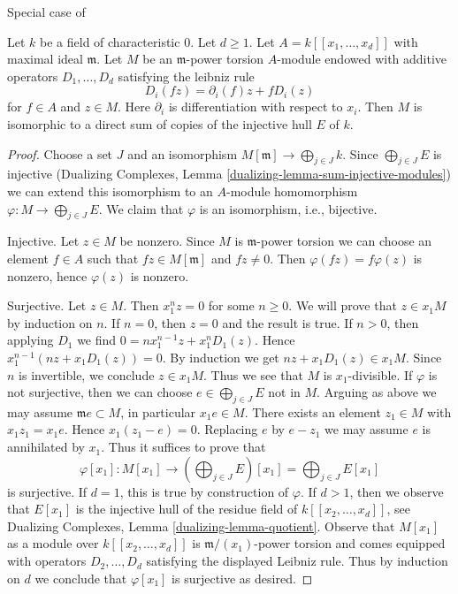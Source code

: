 \begin{lemma}
\label{lemma-structure-torsion-D-module-regular}
\begin{reference}
Special case of \cite[Theorem 2.4]{Lyubeznik}
\end{reference}
Let $k$ be a field of characteristic $0$. Let $d \geq 1$.
Let $A = k[[x_1, \ldots, x_d]]$ with maximal ideal $\mathfrak m$.
Let $M$ be an $\mathfrak m$-power torsion $A$-module endowed with
additive operators $D_1, \ldots, D_d$ satisfying the leibniz rule
$$
D_i(fz) = \partial_i(f) z + f D_i(z)
$$
for $f \in A$ and $z \in M$. Here $\partial_i$ is
differentiation with respect to $x_i$.
Then $M$ is isomorphic to a direct sum
of copies of the injective hull $E$ of $k$.
\end{lemma}

\begin{proof}
Choose a set $J$ and an isomorphism $M[\mathfrak m] \to \bigoplus_{j \in J} k$.
Since $\bigoplus_{j \in J} E$ is injective
(Dualizing Complexes, Lemma \ref{dualizing-lemma-sum-injective-modules})
we can extend this isomorphism to an $A$-module homomorphism
$\varphi : M \to \bigoplus_{j \in J} E$.
We claim that $\varphi$ is an isomorphism, i.e., bijective.

\medskip\noindent
Injective. Let $z \in M$ be nonzero. Since $M$ is $\mathfrak m$-power torsion
we can choose an element $f \in A$ such that $fz \in M[\mathfrak m]$ and
$fz \not = 0$. Then $\varphi(fz) = f\varphi(z)$ is nonzero, hence
$\varphi(z)$ is nonzero.

\medskip\noindent
Surjective. Let $z \in M$. Then $x_1^n z = 0$ for some $n \geq 0$.
We will prove that $z \in x_1M$ by induction on $n$.
If $n = 0$, then $z = 0$ and the result is true.
If $n > 0$, then applying $D_1$ we find $0 = n x_1^{n - 1} z + x_1^nD_1(z)$.
Hence $x_1^{n - 1}(nz + x_1D_1(z)) = 0$. By induction we get
$nz + x_1D_1(z) \in x_1M$. Since $n$ is invertible, we conclude
$z \in x_1M$. Thus we see that $M$ is $x_1$-divisible.
If $\varphi$ is not surjective, then we can choose
$e \in \bigoplus_{j \in J} E$ not in $M$.
Arguing as above we may assume $\mathfrak m e \subset M$,
in particular $x_1 e \in M$. There exists an element
$z_1 \in M$ with $x_1 z_1 = x_1 e$. Hence
$x_1(z_1 - e) = 0$. Replacing $e$ by $e - z_1$
we may assume $e$ is annihilated by $x_1$.
Thus it suffices to prove that
$$
\varphi[x_1] :
M[x_1]
\longrightarrow
\left(\bigoplus\nolimits_{j \in J} E\right)[x_1] =
\bigoplus\nolimits_{j \in J} E[x_1]
$$
is surjective. If $d = 1$, this is true by construction of $\varphi$.
If $d > 1$, then we observe that $E[x_1]$ is the injective hull
of the residue field of $k[[x_2, \ldots, x_d]]$, see
Dualizing Complexes, Lemma \ref{dualizing-lemma-quotient}.
Observe that $M[x_1]$ as a module over $k[[x_2, \ldots, x_d]]$
is $\mathfrak m/(x_1)$-power torsion and comes
equipped with operators $D_2, \ldots, D_d$ satisfying
the displayed Leibniz rule.
Thus by induction on $d$ we conclude that $\varphi[x_1]$
is surjective as desired.
\end{proof}